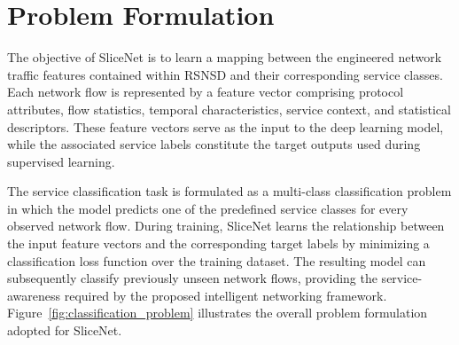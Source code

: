 \documentclass[12pt,a4paper]{report}
\begin{document}
	\section{Problem Formulation}
	\label{sec:problem}
	
	The objective of SliceNet is to learn a mapping between the engineered network traffic features contained within RSNSD and their corresponding service classes. Each network flow is represented by a feature vector comprising protocol attributes, flow statistics, temporal characteristics, service context, and statistical descriptors. These feature vectors serve as the input to the deep learning model, while the associated service labels constitute the target outputs used during supervised learning.
	
	The service classification task is formulated as a multi-class classification problem in which the model predicts one of the predefined service classes for every observed network flow. During training, SliceNet learns the relationship between the input feature vectors and the corresponding target labels by minimizing a classification loss function over the training dataset. The resulting model can subsequently classify previously unseen network flows, providing the service-awareness required by the proposed intelligent networking framework. Figure~\ref{fig:classification_problem} illustrates the overall problem formulation adopted for SliceNet.
	
\end{document}
